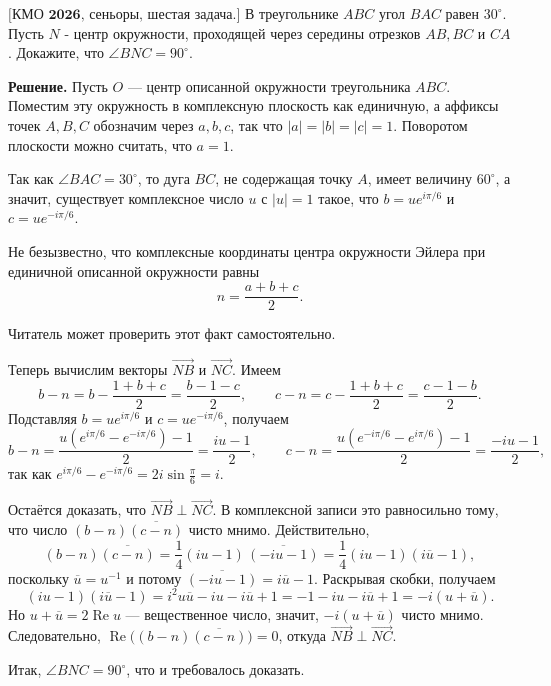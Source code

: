 $\bigl[\textbf{КМО 2026, сеньоры, шестая задача.}\bigr]$
В треугольнике $A B C$ угол $B A C$ равен $30^{\circ}$. Пусть $N$ - центр окружности, проходящей через середины отрезков $A B, B C$ и $C A$. Докажите, что $\angle B N C=90^{\circ}$.

\textbf{Решение.} Пусть $O$ — центр описанной окружности треугольника $ABC$. Поместим эту окружность в комплексную плоскость как единичную, а аффиксы точек $A,B,C$ обозначим через $a,b,c$, так что $|a|=|b|=|c|=1$. Поворотом плоскости можно считать, что $a=1$.

Так как $\angle BAC=30^\circ$, то дуга $BC$, не содержащая точку $A$, имеет величину $60^\circ$, а значит, существует комплексное число $u$ с $|u|=1$ такое, что $b=u e^{i\pi/6}$ и $c=u e^{-i\pi/6}$.

Не безызвестно, что комплексные координаты центра окружности Эйлера при единичной описанной окружности равны
\[
n=\frac{a+b+c}{2}.
\]

Читатель может проверить этот факт самостоятельно.

Теперь вычислим векторы $\overrightarrow{NB}$ и $\overrightarrow{NC}$. Имеем
\[
b-n=b-\frac{1+b+c}{2}=\frac{b-1-c}{2},\qquad
c-n=c-\frac{1+b+c}{2}=\frac{c-1-b}{2}.
\]
Подставляя $b=u e^{i\pi/6}$ и $c=u e^{-i\pi/6}$, получаем
\[
b-n=\frac{u(e^{i\pi/6}-e^{-i\pi/6})-1}{2}=\frac{iu-1}{2},\qquad
c-n=\frac{u(e^{-i\pi/6}-e^{i\pi/6})-1}{2}=\frac{-iu-1}{2},
\]
так как $e^{i\pi/6}-e^{-i\pi/6}=2i\sin\frac{\pi}{6}=i$.

Остаётся доказать, что $\overrightarrow{NB}\perp\overrightarrow{NC}$. В комплексной записи это равносильно тому, что число $(b-n)\overline{(c-n)}$ чисто мнимо. Действительно,
\[
(b-n)\overline{(c-n)}=\frac14(iu-1)\,\overline{(-iu-1)}=\frac14(iu-1)(i\overline{u}-1),
\]
поскольку $\overline{u}=u^{-1}$ и потому $\overline{(-iu-1)}=i\overline{u}-1$. Раскрывая скобки, получаем
\[
(iu-1)(i\overline{u}-1)=i^2u\overline{u}-iu-i\overline{u}+1=-1-iu-i\overline{u}+1=-i(u+\overline{u}).
\]
Но $u+\overline{u}=2\operatorname{Re}u$ — вещественное число, значит, $-i(u+\overline{u})$ чисто мнимо. Следовательно, $\operatorname{Re}\bigl((b-n)\overline{(c-n)}\bigr)=0$, откуда $\overrightarrow{NB}\perp\overrightarrow{NC}$.

Итак, $\angle BNC=90^\circ$, что и требовалось доказать.